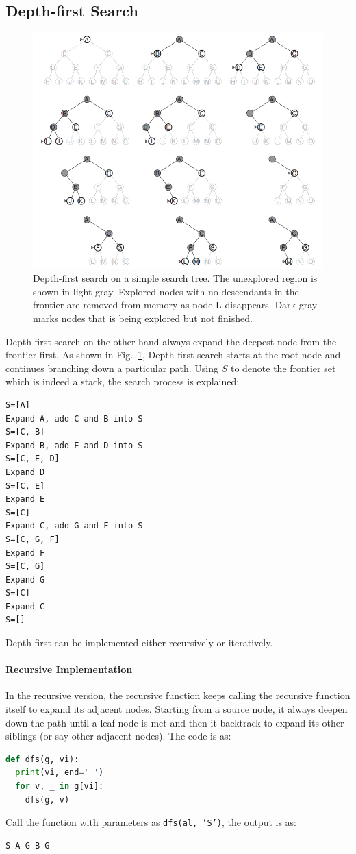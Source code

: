 \documentclass[main.tex]{subfiles}
\begin{document}
\subsection{Depth-first Search}
\begin{figure}[!ht]
    \centering
     \includegraphics[width=0.96\columnwidth]{fig/general_depth_first_search.png}
    \caption{Depth-first search on a simple search tree. The unexplored region is shown in light gray. Explored nodes with no descendants in the frontier are removed from memory as node L disappears. Dark gray marks nodes that is being explored but not finished.   }
    \label{fig:depth_first_search_strategy}
\end{figure}
Depth-first search on the other hand always expand the deepest node from the frontier first. As shown in Fig.~\ref{fig:depth_first_search_strategy}, Depth-first search starts at the root node and continues branching down a particular path. Using $S$ to denote the frontier set which is indeed a stack, the search process is explained:
\begin{lstlisting}[numbers=none]
S=[A]
Expand A, add C and B into S
S=[C, B]
Expand B, add E and D into S
S=[C, E, D]
Expand D
S=[C, E]
Expand E
S=[C]
Expand C, add G and F into S
S=[C, G, F]
Expand F
S=[C, G]
Expand G
S=[C]
Expand C
S=[]
\end{lstlisting}
Depth-first can be implemented either recursively or iteratively. 
\paragraph{Recursive Implementation}In the recursive version, the recursive function keeps calling the recursive function itself to expand its adjacent nodes. Starting from a source node, it always deepen down the path until a leaf node is met and then it backtrack to expand its other siblings (or say other adjacent nodes). The code is as:
\begin{lstlisting}[language=Python]
def dfs(g, vi):
  print(vi, end=' ')
  for v, _ in g[vi]:   
    dfs(g, v)
\end{lstlisting}
Call the function with parameters as \texttt{dfs(al, 'S')}, the output is as:
\begin{lstlisting}[numbers=none]
S A G B G  
\end{lstlisting}
\end{document}
